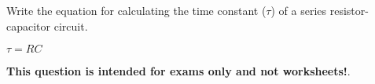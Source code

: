 

Write the equation for calculating the time constant ($\tau$) of a series resistor-capacitor circuit.







$\tau = RC$







{\bf This question is intended for exams only and not worksheets!}.



